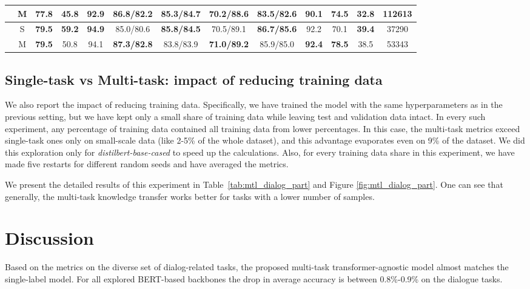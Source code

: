 \begin{itemize}
\begin{table*}
{\begin{tabular}{c|c|c|c|c|c|c|c|c|c|c|c|c}
 & M & \textbf{77.8} & 45.8 & 92.9 & 86.8/82.2 & \textbf{85.3/84.7} & 70.2/88.6 & 83.5/82.6 & 90.1 & \textbf{74.5} & \textbf{32.8} & 112613\\  \hline
\textit{\multirow{2}{*}{bert-large-cased}} & S & \textbf{79.5} & \textbf{59.2} & \textbf{94.9} & 85.0/80.6 & \textbf{85.8/84.5} & 70.5/89.1 & \textbf{86.7/85.6} & 92.2 & 70.1 & \textbf{39.4} & 37290 \\ 
 & M & \textbf{79.5} & 50.8 & 94.1 & \textbf{87.3/82.8} & 83.8/83.9 & \textbf{71.0/89.2} & 85.9/85.0 & \textbf{92.4} & \textbf{78.5} & 38.5 & 53343 \\  \hline
\end{tabular}
}
\end{table*}
\subsection{Single-task vs Multi-task: impact of reducing training data}
We also report the impact of reducing training data. Specifically, we have trained the model with the same hyperparameters as in the previous setting, but we have kept only a small share of training data while leaving test and validation data intact. In every such experiment, any percentage of training data contained all training data from lower percentages.%
In this case, the multi-task metrics exceed single-task ones only on small-scale data (like 2-5\% of the whole dataset), and this advantage evaporates even on 9\% of the dataset. 
We did this exploration only for \textit{distilbert-base-cased} to speed up the calculations. Also, for every training data share in this experiment, we have made five restarts for different random seeds and have averaged the metrics. 

We present the detailed results of this experiment in Table~\ref{tab:mtl_dialog_part} and Figure \ref{fig:mtl_dialog_part}. One can see that generally, the multi-task knowledge transfer works better for tasks with a lower number of samples.



\section{Discussion} 

Based on the metrics on the diverse set of dialog-related tasks, the proposed multi-task transformer-agnostic model almost matches the single-label model. 
For all explored BERT-based backbones the drop in average accuracy is between 0.8\%-0.9\% on the dialogue tasks.


\end{itemize}
